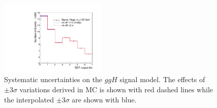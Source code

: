\begin{figure}
\begin{center}
  \includegraphics[width=0.45\textwidth]{hgg7TeV/sidebandMvaPlots/signalModel/systematic_interpolation_test_vtxEff}
\end{center}
\caption{Systematic uncertainties on the $ggH$ signal model. 
The effects of $\pm3\sigma$ variations 
derived in MC is shown with red dashed lines while the interpolated $\pm3\sigma$ are shown with blue.}
\label{fig:additionalsignalsys}
\end{figure}

